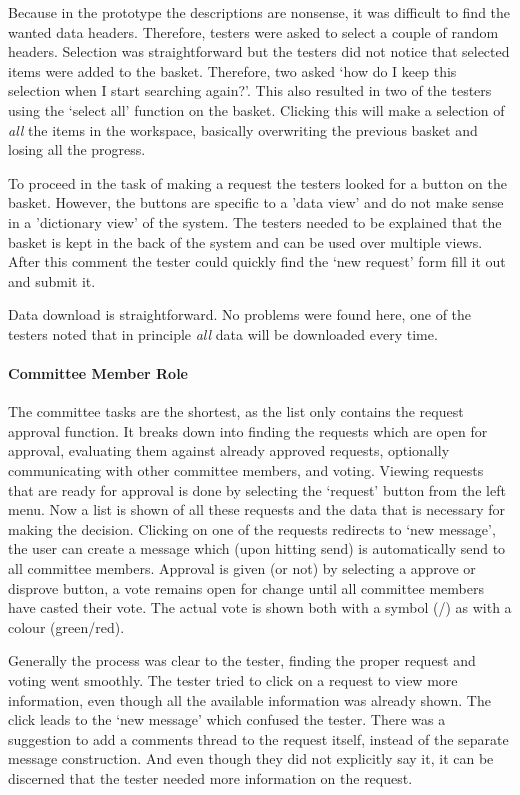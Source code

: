 Because in the prototype the descriptions are nonsense, it was difficult to find the wanted data headers.
Therefore, testers were asked to select a couple of random headers.
Selection was straightforward but the testers did not notice that selected items were added to the basket.
Therefore, two asked `how do I keep this selection when I start searching again?'.
This also resulted in two of the testers using the `select all' function on the basket.
Clicking this will make a selection of \emph{all} the items in the workspace, basically overwriting the previous basket and losing all the progress.

To proceed in the task of making a request the testers looked for a button on the basket.
However, the buttons are specific to a 'data view' and do not make sense in a 'dictionary view' of the system.
The testers needed to be explained that the basket is kept in the back of the system and can be used over multiple views.
After this comment the tester could quickly find the `new request' form fill it out and submit it.

Data download is straightforward. 
No problems were found here, one of the testers noted that in principle \emph{all} data will be downloaded every time.

\paragraph{Committee Member Role}
The committee tasks are the shortest, as the list only contains the request approval function. 
It breaks down into finding the requests which are open for approval, evaluating them against already approved requests, optionally communicating with other committee members, and voting.
Viewing requests that are ready for approval is done by selecting the `request' button from the left menu.
Now a list is shown of all these requests and the data that is necessary for making the decision.
Clicking on one of the requests redirects to `new message', the user can create a message which (upon hitting send) is automatically send to all committee members.
Approval is given (or not) by selecting a approve or disprove button, a vote remains open for change until all committee members have casted their vote.
The actual vote is shown both with a symbol (\checkmark{}/\texttimes{}) as with a colour (green/red).

Generally the process was clear to the tester, finding the proper request and voting went smoothly.
The tester tried to click on a request to view more information, even though all the available information was already shown.
The click leads to the `new message' which confused the tester.
There was a suggestion to add a comments thread to the request itself, instead of the separate message construction.
And even though they did not explicitly say it, it can be discerned that the tester needed more information on the request.

